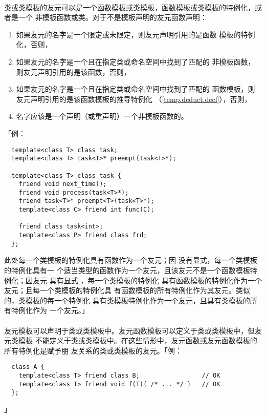 \paragraph{}
类或类模板的友元可以是一个函数模板或类模板，函数模板或类模板的特例化，或者是一个
非模板函数或类。对于不是模板声明的友元函数声明：
\begin{enumerate}
  \item{如果友元的名字是一个限定或未限定，则友元声明引用的是函数
    模板的特例化，否则，}
  \item{如果友元的名字是一个且在指定类或命名空间中找到了匹配的
    非模板函数，则友元声明引用的是该函数，否则，}
  \item{如果友元的名字是一个且在指定类或命名空间中找到了匹配的
    函数模板，则友元声明引用的是该函数模板的推导特例化
    （\ref{temp.deduct.decl}），否则，}
  \item{名字应该是一个声明（或重声明）一个非模板函数的。}
\end{enumerate}
「例：
\begin{lstlisting}
  template<class T> class task;
  template<class T> task<T>* preempt(task<T>*);

  template<class T> class task {
    friend void next_time();
    friend void process(task<T>*);
    friend task<T>* preempt<T>(task<T>*);
    template<class C> friend int func(C);

    friend class task<int>;
    template<class P> friend class frd;
  };
\end{lstlisting}
此处每一个类模板的特例化具有函数作为一个友元；因
没有显式，每一个类模板的特例化具有一
个适当类型的函数作为一个友元，且该友元不是一个函数模板特例化；因友元
具有显式 ，每一个类模板的特例化
具有函数模板的特例化作为一个友元；且每一个类模板的特例化具
有函数模板的所有特例化作为其友元。类似的，类模板的每一个特例化
具有类模板特例化作为一个友元，且具有类模板的所有特例化作为
一个友元。」

\paragraph{}
友元模板可以声明于类或类模板中。友元函数模板可以定义于类或类模板中，但友元类模板
不能定义于类或类模板中。在这些情形中，友元函数或友元函数模板的所有特例化是赋予朋
友关系的类或类模板的友元。「例：
\begin{lstlisting}
  class A {
    template<class T> friend class B;                 // OK
    template<class T> friend void f(T){ /* ... */ }   // OK
  };
\end{lstlisting}」

